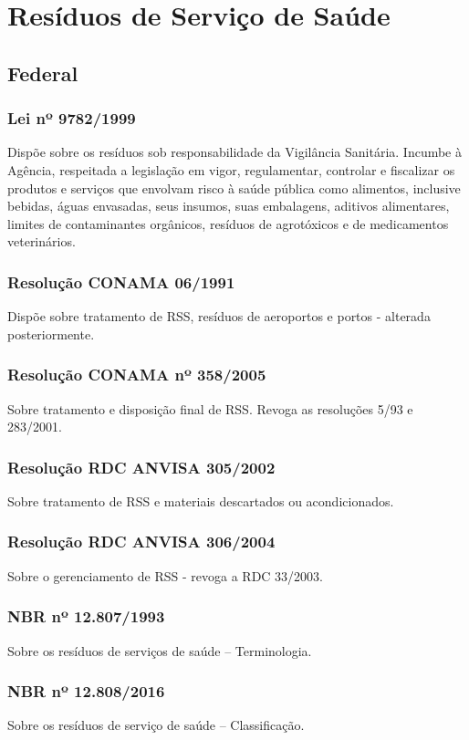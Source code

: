 \section{Resíduos de Serviço de Saúde}
\begin{subapend}
\subsection{Federal}	
	\begin{subsubapend}
		
		\item \subsubsection{Lei nº 9782/1999}
		Dispõe sobre os resíduos sob responsabilidade da Vigilância Sanitária. Incumbe à Agência, respeitada a legislação em vigor, regulamentar, controlar e fiscalizar os produtos e serviços que envolvam risco à saúde pública como alimentos, inclusive bebidas, águas envasadas, seus insumos, suas embalagens, aditivos alimentares, limites de contaminantes orgânicos, resíduos de agrotóxicos e de medicamentos veterinários.
		\subsubsection{Resolução CONAMA 06/1991}
		Dispõe sobre tratamento de RSS, resíduos de aeroportos e portos - alterada posteriormente.
		\subsubsection{Resolução CONAMA nº 358/2005}
		Sobre tratamento e disposição final de RSS. Revoga as resoluções 5/93 e 283/2001.
		\subsubsection{Resolução RDC ANVISA 305/2002}
		Sobre tratamento de RSS e materiais descartados ou acondicionados.
		\subsubsection{Resolução RDC ANVISA 306/2004}
		Sobre o gerenciamento de RSS - revoga a RDC 33/2003.
		\subsubsection{NBR nº 12.807/1993}
		Sobre os resíduos de serviços de saúde – Terminologia.
		\subsubsection{NBR nº 12.808/2016}
		Sobre os resíduos de serviço de saúde – Classificação.

\end{subsubapend}
\end{subapend}

